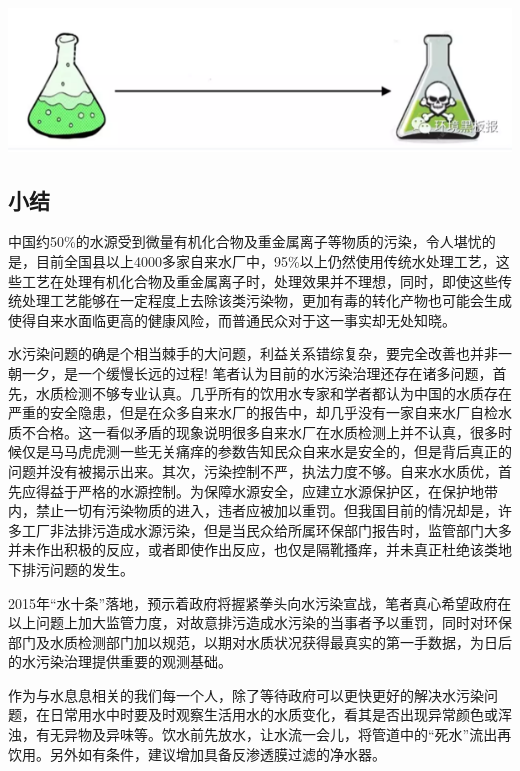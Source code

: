 \documentclass[]{book}
\begin{document}
\includegraphics[width=8.33in]{images/dushui4}

\hypertarget{ux5c0fux7ed3}{%
\subsection{小结}\label{ux5c0fux7ed3}}

中国约50\%的水源受到微量有机化合物及重金属离子等物质的污染，令人堪忧的是，目前全国县以上4000多家自来水厂中，95\%以上仍然使用传统水处理工艺，这些工艺在处理有机化合物及重金属离子时，处理效果并不理想，同时，即使这些传统处理工艺能够在一定程度上去除该类污染物，更加有毒的转化产物也可能会生成使得自来水面临更高的健康风险，而普通民众对于这一事实却无处知晓。

水污染问题的确是个相当棘手的大问题，利益关系错综复杂，要完全改善也并非一朝一夕，是一个缓慢长远的过程! 笔者认为目前的水污染治理还存在诸多问题，首先，水质检测不够专业认真。几乎所有的饮用水专家和学者都认为中国的水质存在严重的安全隐患，但是在众多自来水厂的报告中，却几乎没有一家自来水厂自检水质不合格。这一看似矛盾的现象说明很多自来水厂在水质检测上并不认真，很多时候仅是马马虎虎测一些无关痛痒的参数告知民众自来水是安全的，但是背后真正的问题并没有被揭示出来。其次，污染控制不严，执法力度不够。自来水水质优，首先应得益于严格的水源控制。为保障水源安全，应建立水源保护区，在保护地带内，禁止一切有污染物质的进入，违者应被加以重罚。但我国目前的情况却是，许多工厂非法排污造成水源污染，但是当民众给所属环保部门报告时，监管部门大多并未作出积极的反应，或者即使作出反应，也仅是隔靴搔痒，并未真正杜绝该类地下排污问题的发生。

2015年``水十条''落地，预示着政府将握紧拳头向水污染宣战，笔者真心希望政府在以上问题上加大监管力度，对故意排污造成水污染的当事者予以重罚，同时对环保部门及水质检测部门加以规范，以期对水质状况获得最真实的第一手数据，为日后的水污染治理提供重要的观测基础。

作为与水息息相关的我们每一个人，除了等待政府可以更快更好的解决水污染问题，在日常用水中时要及时观察生活用水的水质变化，看其是否出现异常颜色或浑浊，有无异物及异味等。饮水前先放水，让水流一会儿，将管道中的``死水''流出再饮用。另外如有条件，建议增加具备反渗透膜过滤的净水器。
\end{document}
